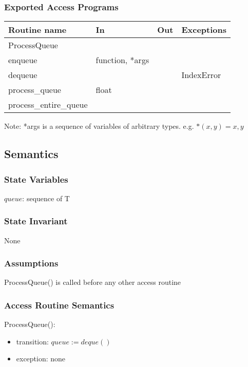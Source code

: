 \documentclass{article}
\begin{document}
\subsubsection {Exported Access Programs}
\begin{table}[!htbp]
\begin{tabular}{| l | l | l | l |}
\hline
\textbf{Routine name} & \textbf{In} & \textbf{Out} & \textbf{Exceptions}\\
\hline
ProcessQueue & ~  & ~ & ~\\
\hline
enqueue & function, *args  & ~ & ~\\
\hline
dequeue & ~ & ~ & IndexError\\
\hline
process\_queue & float & ~ & ~\\
\hline
process\_entire\_queue & ~ & ~ & ~\\

\hline
\end{tabular}
\begin{tablenotes}
  \small
  \item Note: *args is a sequence of variables of arbitrary types. e.g. $*(x, y)=x, y$
\end{tablenotes}
\end{table}
\FloatBarrier

\subsection {Semantics}

\subsubsection {State Variables}

$queue$: sequence of T
\subsubsection {State Invariant}

None

\subsubsection {Assumptions}

ProcessQueue() is called before any other access routine

\subsubsection {Access Routine Semantics}
\noindent ProcessQueue():
\begin{itemize}
\item transition: $queue := deque()$
\item exception: none
\end{itemize}\vspace{6mm}
\end{document}
